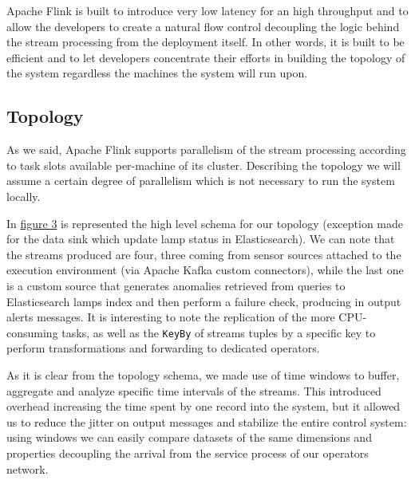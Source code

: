 Apache Flink is built to introduce very low latency for an high throughput and to allow the developers to create a natural flow control decoupling the logic behind the stream processing from the deployment itself. In other words, it is built to be efficient and to let developers concentrate their efforts in building the topology of the system regardless the machines the system will run upon.

\subsection{Topology}
As we said, Apache Flink supports parallelism of the stream processing according to task slots available per-machine of its cluster. Describing the topology we will assume a certain degree of parallelism which is not necessary to run the system locally.

In \hyperref[fig:ember_topology]{figure 3} is represented the high level schema for our topology (exception made for the data sink which update lamp status in Elasticsearch). We can note that the streams produced are four, three coming from sensor sources attached to the execution environment (via Apache Kafka custom connectors), while the last one is a custom source that generates anomalies retrieved from queries to Elasticsearch lamps index and then perform a failure check, producing in output alerts messages.
It is interesting to note the replication of the more CPU-consuming tasks, as well as the \texttt{KeyBy} of streams tuples by a specific key to perform transformations and forwarding to dedicated operators.

As it is clear from the topology schema, we made use of time windows to buffer, aggregate and analyze specific time intervals of the streams. This introduced overhead increasing the time spent by one record into the system, but it allowed us to reduce the jitter on output messages and stabilize the entire control system: using windows we can easily compare datasets of the same dimensions and properties decoupling the arrival from the service process of our operators network.

